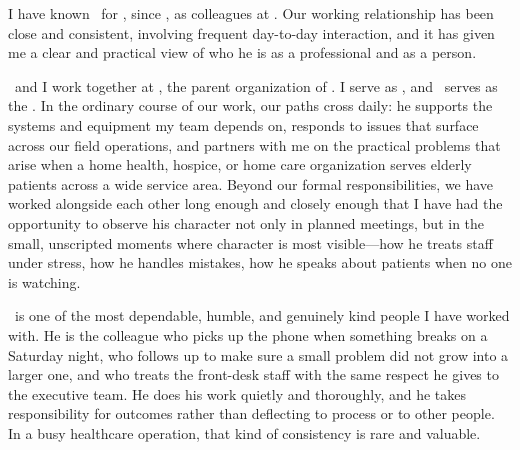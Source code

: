 \resetlicquestions

\licformheader

\licwriterinfo
  {\RefCName}
  {\RefCAddress}
  {\RefCCityStateZip}
  {\RefCPhone}


I have known \ApplicantName\ for \RefCKnownDuration, since \RefCKnownSince, as colleagues at \EmployerName. Our working relationship has been close and consistent, involving frequent day-to-day interaction, and it has given me a clear and practical view of who he is as a professional and as a person.


\ApplicantName\ and I work together at \EmployerName, the parent organization of \EmployerDivisions. I serve as \RefCTitle, and \ApplicantName\ serves as the \EmployerRole. In the ordinary course of our work, our paths cross daily: he supports the systems and equipment my team depends on, responds to issues that surface across our field operations, and partners with me on the practical problems that arise when a home health, hospice, or home care organization serves elderly patients across a wide service area. Beyond our formal responsibilities, we have worked alongside each other long enough and closely enough that I have had the opportunity to observe his character not only in planned meetings, but in the small, unscripted moments where character is most visible---how he treats staff under stress, how he handles mistakes, how he speaks about patients when no one is watching.


\ApplicantName\ is one of the most dependable, humble, and genuinely kind people I have worked with. He is the colleague who picks up the phone when something breaks on a Saturday night, who follows up to make sure a small problem did not grow into a larger one, and who treats the front-desk staff with the same respect he gives to the executive team. He does his work quietly and thoroughly, and he takes responsibility for outcomes rather than deflecting to process or to other people. In a busy healthcare operation, that kind of consistency is rare and valuable.

